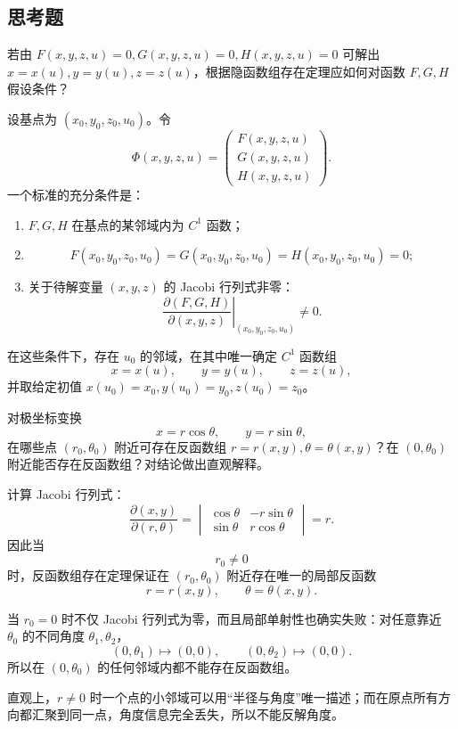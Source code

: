 \subsection{思考题}

\begin{xthought}[1]
若由 $F(x,y,z,u)=0,G(x,y,z,u)=0,H(x,y,z,u)=0$ 可解出 $x=x(u),y=y(u),z=z(u)$，根据隐函数组存在定理应如何对函数 $F,G,H$ 假设条件？
\end{xthought}
\begin{xsolution}
设基点为 $(x_0,y_0,z_0,u_0)$。令
\[
  \Phi(x,y,z,u)=
  \begin{pmatrix}
    F(x,y,z,u)\\G(x,y,z,u)\\H(x,y,z,u)
  \end{pmatrix}.
\]
一个标准的充分条件是：
\begin{enumerate}[label=(\arabic*)]
  \item $F,G,H$ 在基点的某邻域内为 $C^1$ 函数；
  \item
  \[
    F(x_0,y_0,z_0,u_0)=G(x_0,y_0,z_0,u_0)
    =H(x_0,y_0,z_0,u_0)=0;
  \]
  \item 关于待解变量 $(x,y,z)$ 的 Jacobi 行列式非零：
  \[
    \boxed{\displaystyle
      \left.
      \frac{\partial(F,G,H)}{\partial(x,y,z)}
      \right|_{(x_0,y_0,z_0,u_0)}\ne0}.
  \]
\end{enumerate}
在这些条件下，存在 $u_0$ 的邻域，在其中唯一确定 $C^1$ 函数组
\[
  x=x(u),\qquad y=y(u),\qquad z=z(u),
\]
并取给定初值 $x(u_0)=x_0,y(u_0)=y_0,z(u_0)=z_0$。
\end{xsolution}


\begin{xthought}[2]
对极坐标变换
  \[
    x=r\cos\theta,\qquad y=r\sin\theta,
  \]
  在哪些点 $(r_0,\theta_0)$ 附近可存在反函数组 $r=r(x,y),\theta=\theta(x,y)$？在 $(0,\theta_0)$ 附近能否存在反函数组？对结论做出直观解释。
\end{xthought}
\begin{xsolution}
计算 Jacobi 行列式：
\[
  \frac{\partial(x,y)}{\partial(r,\theta)}
  =\begin{vmatrix}
    \cos\theta&-r\sin\theta\\
    \sin\theta&r\cos\theta
  \end{vmatrix}
  =r.
\]
因此当
\[
  \boxed{r_0\ne0}
\]
时，反函数组存在定理保证在 $(r_0,\theta_0)$ 附近存在唯一的局部反函数
\[
  r=r(x,y),\qquad \theta=\theta(x,y).
\]

当 $r_0=0$ 时不仅 Jacobi 行列式为零，而且局部单射性也确实失败：对任意靠近 $\theta_0$ 的不同角度 $\theta_1,\theta_2$，
\[
  (0,\theta_1)\mapsto(0,0),
  \qquad
  (0,\theta_2)\mapsto(0,0).
\]
所以在 $(0,\theta_0)$ 的任何邻域内都不能存在反函数组。

直观上，$r\ne0$ 时一个点的小邻域可以用“半径与角度”唯一描述；而在原点所有方向都汇聚到同一点，角度信息完全丢失，所以不能反解角度。
\end{xsolution}


